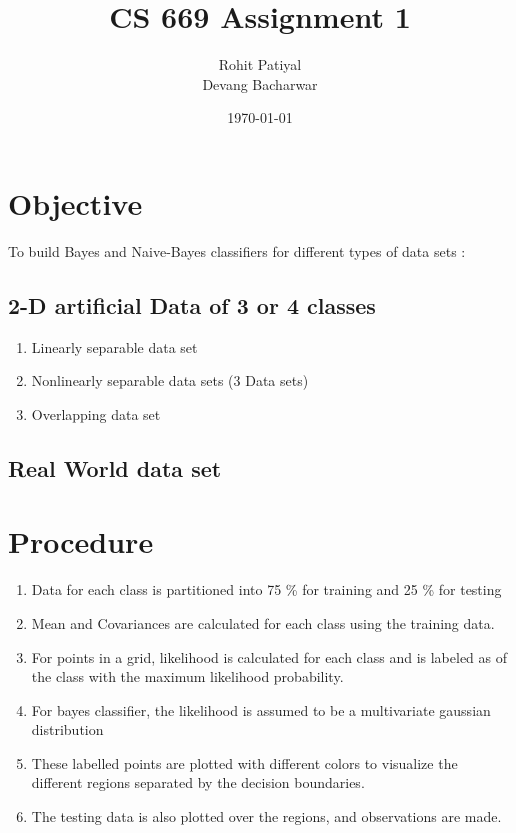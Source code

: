\documentclass[a4paper]{article}
\title{CS 669 Assignment 1}
\author{Rohit Patiyal \\ Devang Bacharwar}
\date{\today}
\begin{document}
\maketitle

\vspace{2.0cm}

\tableofcontents

\clearpage

\section {Objective}
	To build Bayes and Naive-Bayes classifiers for different types of data sets :
	\subsection{2-D artificial Data of 3 or 4 classes}
		\begin{enumerate}
		  \item {Linearly separable data set}
		  \item {Nonlinearly separable data sets (3 Data sets)}
		  \item {Overlapping data set}
		\end{enumerate}
	\subsection{Real World data set}

\vspace{1.0cm}

\section{Procedure}
	\begin{enumerate}
	  \item {Data for each class is partitioned into 75 \% for training and 25
	  \% for testing }
	  \item {Mean and Covariances are calculated for each class using the
	  training data.}
	  \item {For points in a grid, likelihood is calculated for each class and is
	  labeled as of the class with the maximum likelihood probability.}
	  \item{For bayes classifier, the likelihood is assumed to be a multivariate
	  gaussian distribution }
	  \item {These labelled points are plotted with different colors to visualize
	  the different regions separated by the decision boundaries.}
	  \item {The testing data is also plotted over the regions, and observations
	  are made.}
	\end{enumerate}
\end{document}
